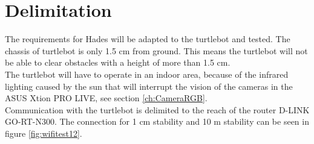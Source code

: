 \chapter{Delimitation} \label{ch:Delimitation}
The requirements for Hades will be adapted to the turtlebot and tested. The chassis of turtlebot is only 1.5 cm from ground. This means the turtlebot will not be able to clear obstacles with a height of more than 1.5 cm.\\
The turtlebot will have to operate in an indoor area, because of the infrared lighting caused by the sun that will interrupt the vision of the cameras in the ASUS Xtion PRO LIVE, see section \ref{ch:CameraRGB}.\\
Communication with the turtlebot is delimited to the reach of the router D-LINK GO-RT-N300. The connection for 1 cm stability and 10 m stability can be seen in figure \ref{fig:wifitest12}.
